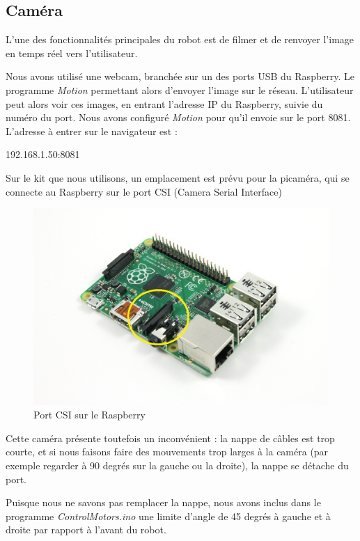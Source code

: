 \documentclass[12pt,a4paper]{report}
\begin{document}
\subsection{Caméra}

L'une des fonctionnalités principales du robot est de filmer et de renvoyer l'image en temps réel vers l'utilisateur.

Nous avons utilisé une webcam, branchée sur un des ports USB du Raspberry. Le programme \textit{Motion} permettant alors d'envoyer l'image sur le réseau. L'utilisateur peut alors voir ces images, en entrant l'adresse IP du Raspberry, suivie du numéro du port. Nous avons configuré \textit{Motion} pour qu'il envoie sur le port 8081. L'adresse à entrer sur le navigateur est :

\begin{verbatimtab}[3]
192.168.1.50:8081
\end{verbatimtab}

Sur le kit que nous utilisons, un emplacement est prévu pour la picaméra, qui se connecte au Raspberry sur le port CSI (Camera Serial Interface)

\begin{figure}[hf!]
\center
\includegraphics[scale=0.2]{images/portCSI.png}
\caption{Port CSI sur le Raspberry}
\end{figure}

Cette caméra présente toutefois un inconvénient : la nappe de câbles est trop courte, et si nous faisons faire des mouvements trop larges à la caméra (par exemple regarder à 90 degrés sur la gauche ou la droite), la nappe se détache du port.

Puisque nous ne savons pas remplacer la nappe, nous avons inclus dans le programme \textit{ControlMotors.ino} une limite d'angle de 45 degrés à gauche et à droite par rapport à l'avant du robot.
\end{document}
